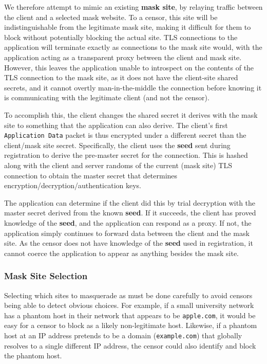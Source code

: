 \documentclass[letterpaper,twocolumn,10pt]{article}
\begin{document}
We therefore attempt to mimic an existing \textbf{mask site}, by relaying
traffic between the client and a selected mask website. To a censor, this site
will be indistinguishable from the legitimate mask site, making it difficult for
them to block without potentially blocking the actual site. TLS connections to the
application will terminate exactly as connections to the mask site would, with the
application acting as a transparent proxy between the client and mask site.
However, this leaves the application unable to introspect on the contents of the
TLS connection to the mask site, as it does not have the client-site shared
secrets, and it cannot overtly man-in-the-middle the connection before knowing
it is communicating with the legitimate client (and not the censor).


To accomplish this, the client changes the shared secret it derives with the
mask site to something that the application can also derive. The client's first
\texttt{Application Data} packet is thus encrypted under a different secret than
the client/mask site secret. Specifically, the client uses the \textbf{seed}
sent during registration to derive the pre-master secret for the connection.
This is hashed along with the client and server randoms of the current (mask
site) TLS connection to obtain the master secret that determines
encryption/decryption/authentication keys.

The application can determine if the client did this by trial decryption with
the master secret derived from the known \textbf{seed}. If it succeeds, the
client has proved knowledge of the \textbf{seed}, and the application can
respond as a proxy. If not, the application simply continues to forward data
between the client and the mask site. As the censor does not have knowledge of
the \textbf{seed} used in registration, it cannot coerce the application to
appear as anything besides the mask site.


\subsubsection{Mask Site Selection}

Selecting which sites to masquerade as must be done carefully to avoid censors
being able to detect obvious choices. For example, if a small university network
has a phantom host in their network that appears to be \texttt{apple.com}, it
would be easy for a censor to block as a likely non-legitimate host. Likewise,
if a phantom host at an IP address pretends to be a domain (\texttt{example.com}) that
globally resolves to a single different IP address, the censor could also
identify and block the phantom host.
\end{document}
